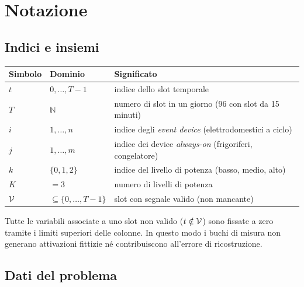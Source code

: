 \chapter{Notazione}
\label{ch:notazione}

\section{Indici e insiemi}

\begin{center}
\begin{tabularx}{\textwidth}{@{}l l X@{}}
\toprule
\textbf{Simbolo} & \textbf{Dominio} & \textbf{Significato} \\
\midrule
$t$        & $0,\dots,T-1$ & indice dello slot temporale \\
$T$        & $\mathbb{N}$  & numero di slot in un giorno (96 con slot da 15 minuti) \\
$i$        & $1,\dots,n$   & indice degli \emph{event device} (elettrodomestici a ciclo) \\
$j$        & $1,\dots,m$   & indice dei device \emph{always-on} (frigoriferi, congelatore) \\
$k$        & $\{0,1,2\}$   & indice del livello di potenza (basso, medio, alto) \\
$K$        & $=3$          & numero di livelli di potenza \\
$\mathcal{V}$    & $\subseteq \{0,\dots,T-1\}$ & slot con segnale valido (non mancante) \\
\bottomrule
\end{tabularx}
\end{center}

Tutte le variabili associate a uno slot non valido ($t \notin \mathcal{V}$) sono fissate a zero
tramite i limiti superiori delle colonne. In questo modo i buchi di misura non generano
attivazioni fittizie né contribuiscono all'errore di ricostruzione.

\section{Dati del problema}

